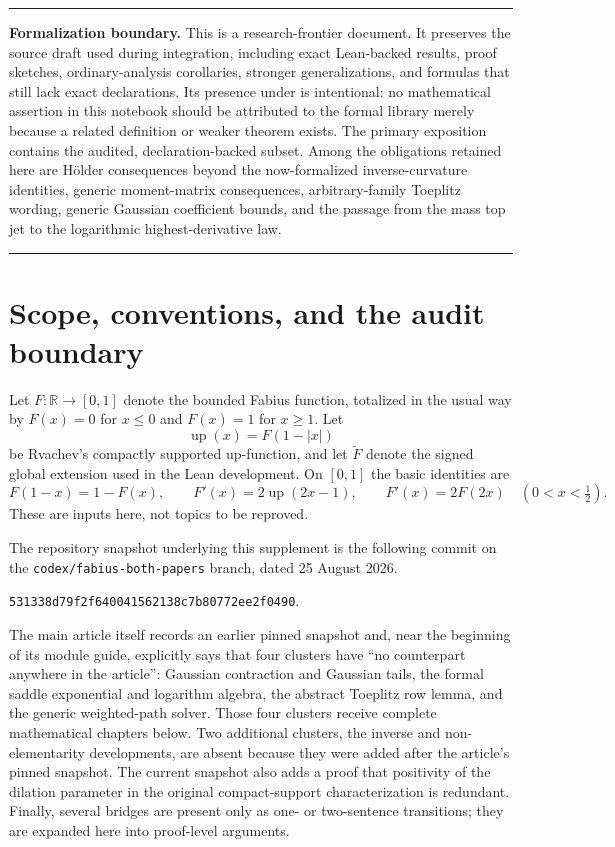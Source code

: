 \documentclass[11pt,oneside]{article}
\theoremstyle{definition}
\theoremstyle{remark}
\newcommand{\R}{\mathbb R}
\newcommand{\Up}{\operatorname{up}}
\newenvironment{boxedremark}{%
  \par\smallskip\noindent\begin{center}\begin{minipage}{0.94\textwidth}%
  \color{black}\hrule\vspace{0.6em}\small
}{%
  \vspace{0.6em}\hrule\end{minipage}\end{center}\smallskip
}
\begin{document}
\begin{boxedremark}
\textbf{Formalization boundary.}
This is a research-frontier document.  It preserves the source draft used during integration,
including exact Lean-backed results, proof sketches, ordinary-analysis corollaries, stronger
generalizations, and formulas that still lack exact declarations.  Its presence under
 is intentional: no mathematical assertion in this
notebook should be attributed to the formal library merely because a related definition or
weaker theorem exists.  The primary exposition contains the audited, declaration-backed
subset.  Among the obligations retained here are H\"older consequences beyond the
now-formalized inverse-curvature identities,
generic moment-matrix consequences, arbitrary-family Toeplitz wording, generic Gaussian
coefficient bounds, and the passage from the mass top jet to the logarithmic
highest-derivative law.
\end{boxedremark}

\tableofcontents
\clearpage

\section{Scope, conventions, and the audit boundary}
\label{sec:scope}

Let $F:\R\to[0,1]$ denote the bounded Fabius function, totalized in the usual way by
$F(x)=0$ for $x\le0$ and $F(x)=1$ for $x\ge1$.  Let
\begin{equation}
 \Up(x)=F(1-|x|)
 \label{eq:up-fold-supp}
\end{equation}
be Rvachev's compactly supported up-function, and let $\widetilde F$ denote the signed
global extension used in the Lean development.  On $[0,1]$ the basic identities are
\begin{equation}
 F(1-x)=1-F(x),
 \qquad
 F'(x)=2\Up(2x-1),
 \qquad
 F'(x)=2F(2x)\quad(0<x<\tfrac12).
 \label{eq:basic-inputs}
\end{equation}
These are inputs here, not topics to be reproved.

The repository snapshot underlying this supplement is the following commit on
the \texttt{codex/fabius-both-papers} branch, dated 25 August 2026.
\begin{center}
 \texttt{531338d79f2f640041562138c7b80772ee2f0490}.
\end{center}
The main article itself records an earlier pinned snapshot and, near the beginning of its
module guide, explicitly says that four clusters have ``no counterpart anywhere in the
article'': Gaussian contraction and Gaussian tails, the formal saddle exponential and
logarithm algebra, the abstract Toeplitz row lemma, and the generic weighted-path solver.
Those four clusters receive complete mathematical chapters below.  Two additional clusters,
the inverse and non-elementarity developments, are absent because they were added after the
article's pinned snapshot.  The current snapshot also adds a proof that positivity of the
dilation parameter in the original compact-support characterization is redundant.  Finally,
several bridges are present only as one- or two-sentence transitions; they are expanded here
into proof-level arguments.
\end{document}

